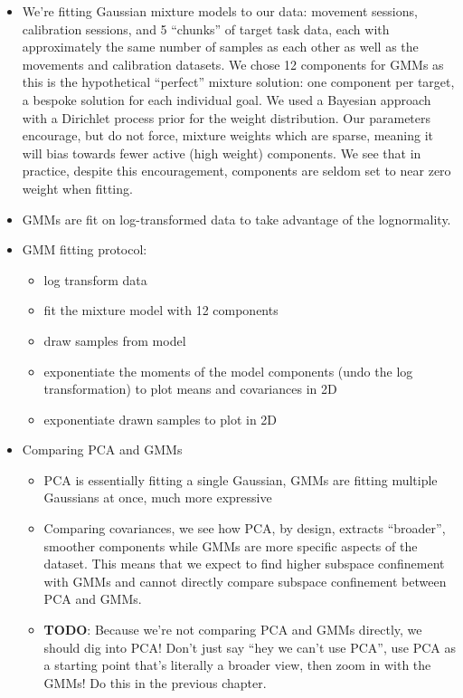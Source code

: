 \documentclass[../main.tex]{subfiles}
\begin{document}
\begin{itemize}
  \setlength\itemsep{0em}
  \item We're fitting Gaussian mixture models to our data: movement sessions, calibration sessions, and 5 ``chunks'' of target task data, each with approximately the same number of samples as each other as well as the movements and calibration datasets. We chose 12 components for GMMs as this is the hypothetical ``perfect'' mixture solution: one component per target, a bespoke solution for each individual goal. We used a Bayesian approach with a Dirichlet process prior for the weight distribution. Our parameters encourage, but do not force, mixture weights which are sparse, meaning it will bias towards fewer active (high weight) components. We see that in practice, despite this encouragement, components are seldom set to near zero weight when fitting.
  \item GMMs are fit on log-transformed data to take advantage of the lognormality.
  \item GMM fitting protocol:
  \begin{itemize}
    \item log transform data
    \item fit the mixture model with 12 components
    \item draw samples from model
    \item exponentiate the moments of the model components (undo the log transformation) to plot means and covariances in 2D
    \item exponentiate drawn samples to plot in 2D
  \end{itemize}
  \item Comparing PCA and GMMs 
  \begin{itemize}
    \item PCA is essentially fitting a single Gaussian, GMMs are fitting multiple Gaussians at once, much more expressive
    \item Comparing covariances, we see how PCA, by design, extracts ``broader'', smoother components while GMMs are more specific aspects of the dataset. This means that we expect to find higher subspace confinement with GMMs and cannot directly compare subspace confinement between PCA and GMMs. 
    \item \textbf{TODO}: Because we're not comparing PCA and GMMs directly, we should dig into PCA! Don't just say ``hey we can't use PCA'', use PCA as a starting point that's literally a broader view, then zoom in with the GMMs! Do this in the previous chapter.

\end{itemize}
\end{itemize}
\end{document}
